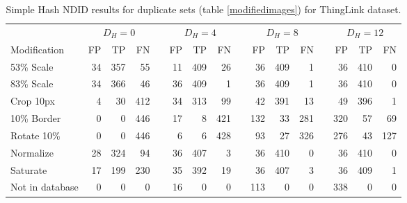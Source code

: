 \documentclass[english,12pt,a4paper,pdftex,elec,utf8, table]{aaltothesis}
\begin{document}
\begin{table}[htb]\footnotesize
\caption{ Simple Hash NDID results for duplicate sets (table \ref{modifiedimages}) for ThingLink dataset. }
\label{simplethinglinkresults}
\begin{center}
  \setlength\tabcolsep{3pt} %
  \begin{tabular}{@{}lrrrrrrrrrrrrrrr@{}}
    \toprule
    & \multicolumn{3}{c}{$D_H = 0$} &\phantom{abc} &\multicolumn{3}{c}{$D_H = 4$} &\phantom{abc} & \multicolumn{3}{c}{$D_H=8$} &\phantom{abc} & \multicolumn{3}{c}{$D_H=12$}\\
\cmidrule{2-4} \cmidrule{6-8} \cmidrule{10-12} \cmidrule{14-16}
    Modification & FP & TP & FN &\phantom{abc} & FP & TP & FN &\phantom{abc} & FP & TP & FN &\phantom{abc} & FP & TP & FN\\ \midrule
    53\% Scale   & 34 & 357 & 55 &\phantom{abc} & 11 & 409 & 26 &\phantom{abc} & 36 & 409 & 1 &\phantom{abc} & 36 & 410 & 0\\
    83\% Scale   & 34 & 366 & 46 &\phantom{abc} & 36 & 409 & 1 &\phantom{abc} & 36 & 409 & 1 &\phantom{abc} & 36 & 410 & 0\\
    Crop 10px    & 4 & 30 & 412 &\phantom{abc} & 34 & 313 & 99 &\phantom{abc} & 42 & 391 & 13 &\phantom{abc} & 49 & 396 & 1\\
    10\% Border  & 0 & 0 & 446 & \phantom{abc} & 17 & 8 & 421 &\phantom{abc} & 132 & 33 & 281 &\phantom{abc} & 320 & 57 & 69\\
    Rotate 10\%  & 0 & 0 & 446 &\phantom{abc} & 6 & 6 & 428 &\phantom{abc} & 93 & 27 & 326 &\phantom{abc} & 276 & 43 & 127\\
    Normalize    & 28 & 324 & 94 &\phantom{abc} & 36 & 407 & 3 &\phantom{abc} & 36 & 410 & 0 &\phantom{abc} & 36 & 410 & 0\\
    Saturate     & 17 & 199 & 230 &\phantom{abc} & 35 & 392 & 19 &\phantom{abc} & 36 & 407 & 3 &\phantom{abc} & 36 & 409 & 1\\
    Not in database     & 0& 0& 0 &\phantom{abc} & 16 & 0 & 0 &\phantom{abc} &113 & 0 & 0 &\phantom{abc} & 338 & 0 & 0\\
\bottomrule
\end{tabular}
\end{center}
\end{table}
\end{document}

